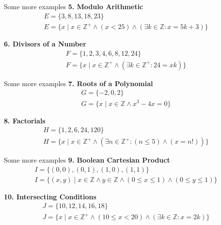 \documentclass{beamer}
\begin{document}
\begin{frame}{Some more examples}
    \textbf{5. Modulo Arithmetic}
    \begin{gather*}
        E = \{3, 8, 13, 18, 23\} \\
        E = \{ x \mid x \in \mathbb{Z}^+ \land (x < 25) \land (\exists k \in \mathbb{Z} : x = 5k + 3) \}
    \end{gather*}
    
    \vspace{0.5cm}
    
    \textbf{6. Divisors of a Number}
    \begin{gather*}
        F = \{1, 2, 3, 4, 6, 8, 12, 24\} \\
        F = \{ x \mid x \in \mathbb{Z}^+ \land (\exists k \in \mathbb{Z}^+ : 24 = xk) \}
    \end{gather*}
\end{frame}

\begin{frame}{Some more examples}
    \textbf{7. Roots of a Polynomial}
    \begin{gather*}
        G = \{-2, 0, 2\} \\
        G = \{ x \mid x \in \mathbb{Z} \land x^3 - 4x = 0 \}
    \end{gather*}
    
    \vspace{0.5cm}
    
    \textbf{8. Factorials}
    \begin{gather*}
        H = \{1, 2, 6, 24, 120\} \\
        H = \{ x \mid x \in \mathbb{Z}^+ \land (\exists n \in \mathbb{Z}^+ : (n \le 5) \land (x = n!)) \}
    \end{gather*}
\end{frame}

\begin{frame}{Some more examples}
    \textbf{9. Boolean Cartesian Product}
    \begin{gather*}
        I = \{(0,0), (0,1), (1,0), (1,1)\} \\
        I = \{ (x, y) \mid x \in \mathbb{Z} \land y \in \mathbb{Z} \land (0 \le x \le 1) \land (0 \le y \le 1) \}
    \end{gather*}
    
    \vspace{0.5cm}
    
    \textbf{10. Intersecting Conditions}
    \begin{gather*}
        J = \{10, 12, 14, 16, 18\} \\
        J = \{ x \mid x \in \mathbb{Z}^+ \land (10 \le x < 20) \land (\exists k \in \mathbb{Z} : x = 2k) \}
    \end{gather*}
\end{frame}
\end{document}
